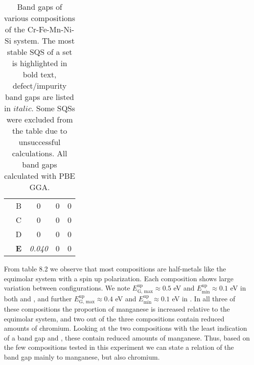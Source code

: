\begin{table}[H]
\begin{tabular}{@{}ccccc@{}}
\multicolumn{1}{c|}{}                                       & B          & 0                                                                           & 0                                                                           & 0                                                                                 \\
\multicolumn{1}{c|}{}                                       & C          & 0                                                                           & 0                                                                           & 0                                                                                 \\
\multicolumn{1}{c|}{}                                       & D          & 0                                                                           & 0                                                                           & 0                                                                                 \\
\multicolumn{1}{c|}{}                                       & \textbf{E} & \textit{0.040}                                                               & 0                                                                           & 0                                                                                 \\ \bottomrule 
\end{tabular}
\caption{Band gaps of various compositions of the Cr-Fe-Mn-Ni-Si system. The most stable SQS of a set is highlighted in bold text, defect/impurity band gaps are listed in $italic$. Some SQSs were excluded from the table due to unsuccessful calculations. All band gaps calculated with PBE GGA.}
\end{table}

From table 8.2 we observe that most compositions are half-metals like the equimolar system with a spin up polarization. Each composition shows large variation between configurations. We note $E_\text{G, max} ^\text{up} \approx 0.5$ eV and $E_\text{min} ^\text{up} \approx 0.1$ eV in both  and , and further $E_\text{G, max} ^\text{up} \approx 0.4$ eV and $E_\text{min} ^\text{up} \approx 0.1$ eV in . In all three of these compositions the proportion of manganese is increased relative to the equimolar system, and two out of the three compositions contain reduced amounts of chromium. Looking at the two compositions with the least indication of a band gap  and , these contain reduced amounts of manganese. Thus, based on the few compositions tested in this experiment we can state a relation of the band gap mainly to manganese, but also chromium.     

